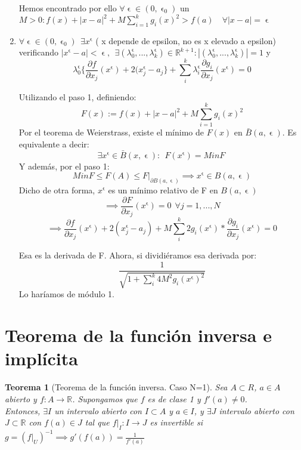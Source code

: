 \documentclass[11pt, a4paper, titlepage]{article}
\makeatletter
\let\epsilon\upvarepsilon
\renewenvironment{proof}[1][\proofname] {\vspace{-15pt}\par\pushQED{\qed}\normalfont\topsep6\p@\@plus6\p@\relax\trivlist\item[\hskip\labelsep\it#1\@addpunct{.}]\ignorespaces}{\popQED\endtrivlist\@endpefalse}
\newcommand{\R}{\mathbb{R}}
\theoremstyle{theorem-style}
\newtheorem*{nth}{Teorema}
\theoremstyle{definition-style}
\theoremstyle{remark-style}
\theoremstyle{example-style}
\makeatother
\begin{document}
\begin{proof}
\begin{enumerate}
	
	Hemos encontrado por ello $\forall \epsilon \in (0,\epsilon_0)$ un $M>0: f(x) + |x-a|^2 + M \sum_{i=1}^kg_i(x)^2 > f(a) \quad \forall |x-a|= \upvarepsilon$
	\item  $\forall \epsilon \in (0,\epsilon_0) \ \ \exists x^\epsilon$ ( x depende de epsilon, no es x elevado a epsilon) verificando $|x^\epsilon -a| < \epsilon, \ \ \exists(\lambda_0^\epsilon,...,\lambda_k^\epsilon)\in \mathbb{R}^{k+1} : |(\lambda_0^{\epsilon},...,\lambda_k^\epsilon)|= 1$ y $$\lambda_0^\epsilon\{\frac{\partial f}{\partial x_j}(x^\epsilon) + 2(x_j^\epsilon -a_j\}+ \sum_i^k \lambda_i^\epsilon \frac{\partial g_i}{\partial x_j}(x^\epsilon) = 0$$
	
	Utilizando el paso 1, definiendo:
	\[
	F(x):=f(x) + |x-a|^2 + M \sum_{i=1}^kg_i(x)^2
	\]
	Por el teorema de Weierstrass, existe el mínimo de $F(x)$ en $\bar{B}(a,\epsilon)$. Es equivalente a decir:
	\[
	\exists x^\epsilon \in \bar{B}(x,\epsilon) : \ \ F(x^\epsilon)= Min F \ 
	\]
	Y además, por el paso 1:
	\[
	Min F \leq F(A) \leq F|_{\partial B(a,\epsilon)} \implies x^\epsilon \in B(a,\epsilon)
	\]
	Dicho de otra forma, $x^\epsilon$ es un mínimo relativo de F en $B(a,\epsilon)$
	\[
	 \implies \frac{\partial F}{\partial x_j}(x^\epsilon) = 0 \ \ \forall j=1,...,N
	 \]
	 \[
	 \implies \frac{\partial f}{\partial x_j}(x^\epsilon) + 2(x_j^\epsilon -a_j) + M \sum_i^k 2 g_i(x^\epsilon)*\frac{\partial g_i}{\partial x_j}(x^\epsilon) = 0
	 \]
	
	Esa es la derivada de F. Ahora, si dividiéramos esa derivada por:
	\[
	\frac{1}{\sqrt{1+\sum_i^k4M^2g_i(x^\epsilon)^2}}
	\]
	Lo haríamos de módulo 1.
\end{enumerate}
\end{proof}

\section{Teorema de la función inversa e implícita}
\begin{nth}[Teorema de la función inversa. Caso N=1]
	Sea $A\subset R$, $a \in A$ abierto y $f:A \to \R$. Supongamos que $f$ es de clase 1 y $f'(a) \ne 0$.\\
	 Entonces, $\exists I $ un intervalo abierto con $I \subset A$ y $a \in I$, y $\exists J$ intervalo abierto con $J\subset \R$ con $f(a) \in J$ tal que $f|_I: I \to J$ es invertible si $g = (f|_U)^{-1} \implies g'(f(a)) = \frac{1}{f'(a)}$
\end{nth}
\end{document}
